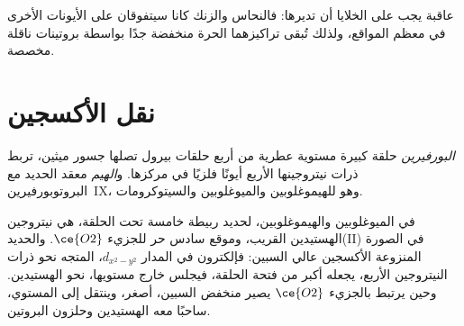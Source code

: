 عاقبة يجب على الخلايا أن تديرها: فالنحاس والزنك كانا سيتفوقان على
الأيونات الأخرى في معظم المواقع، ولذلك تُبقى تراكيزهما الحرة منخفضة جدًا
بواسطة بروتينات ناقلة مخصصة.

\section{نقل الأكسجين}

\begin{definition}\label{def:b3:bioinorganic:haem}
\emph{البورفيرين} حلقة كبيرة مستوية عطرية من أربع
حلقات بيرول تصلها جسور ميثين، تربط ذرات نيتروجينها الأربع أيونًا فلزيًا
في مركزها. و\emph{الهيم} معقد الحديد مع البروتوبورفيرين~IX،
وهو  للهيموغلوبين والميوغلوبين والسيتوكرومات.
\end{definition}

في الميوغلوبين والهيموغلوبين، لحديد  ربيطة خامسة تحت
الحلقة، هي نيتروجين الهستيدين القريب، وموقع سادس حر للجزيء $\ce{O2}$.
والحديد(II) في الصورة المنزوعة الأكسجين عالي السبين: فإلكترون في المدار $d_{x^2-y^2}$، المتجه نحو ذرات
النيتروجين الأربع، يجعله أكبر من فتحة الحلقة، فيجلس خارج
مستويها، نحو الهستيدين. وحين يرتبط بالجزيء $\ce{O2}$ يصير منخفض السبين، أصغر، 
وينتقل إلى المستوي، ساحبًا معه الهستيدين وحلزون البروتين.

